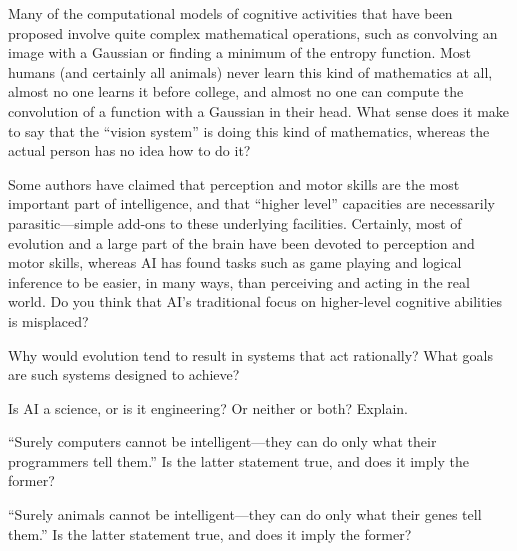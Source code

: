 \begin{exercise}
Many of the computational models of cognitive activities that have been 
proposed involve quite complex mathematical operations, such as convolving
an image with a Gaussian or finding a minimum of the entropy function.  
Most humans (and certainly all animals) never learn this kind of mathematics
at all, almost no one learns it before college, and almost no one can compute
the convolution of a function with a Gaussian in their head.  What sense does 
it make to say that the ``vision system'' is doing this kind of mathematics,
whereas the actual person has no idea how to do it?
\end{exercise} 

\begin{iexercise}
Some authors have claimed that perception and motor
skills are the most important part of intelligence, and that
``higher level'' capacities are necessarily parasitic---simple add-ons
to these underlying facilities.  Certainly, most of
evolution and a large part of the brain have been
devoted to perception and motor skills, whereas AI has found tasks
such as game playing and logical inference to be easier, in many ways,
than perceiving and acting in the real world. Do you think that AI's
traditional focus on higher-level cognitive abilities is misplaced?
\end{iexercise} 

\begin{uexercise}
    Why would evolution tend to result in systems that act rationally?
    What goals are such systems designed to achieve?
\end{uexercise} 

\begin{exercise}
Is AI a science, or is it engineering? Or neither or both? Explain.
\end{exercise} 

\begin{exercise}
``Surely computers cannot be intelligent---they can do only what their
programmers tell them.'' Is the latter statement true, and does it imply the
former?
\end{exercise} 

\begin{exercise}
``Surely animals cannot be intelligent---they can do only what their
genes tell them.''  Is the latter statement true, and does it imply the
former?
\end{exercise} 

